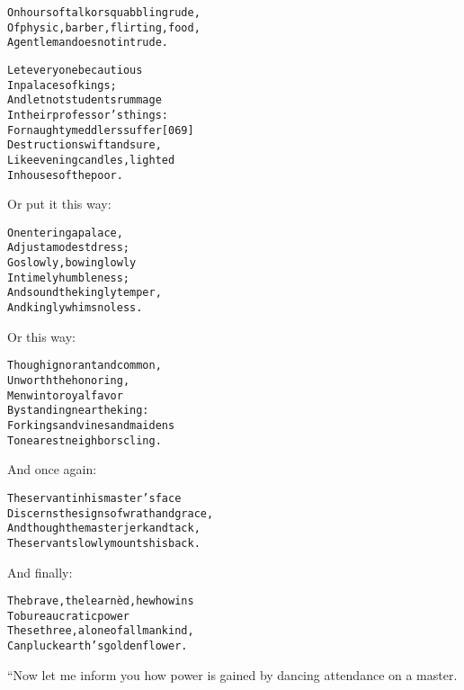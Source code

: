 \documentclass{article}
\renewenvironment{verbatim}{\begin{alltt}\normalfont\begin{centering}}{\end{centering}\end{alltt}}
\begin{document}
\begin{verbatim}
On hours of talk or squabbling rude,
Of physic, barber, flirting, food,
A gentleman does not intrude.

Let everyone be cautious
    In palaces of kings;
And let not students rummage
    In their professor's things:
For naughty meddlers suffer                             [069]
    Destruction swift and sure,
Like evening candles, lighted
    In houses of the poor.
\end{verbatim}
Or put it this way:

\begin{verbatim}
On entering a palace,
    Adjust a modest dress;
Go slowly, bowing lowly
    In timely humbleness;
And sound the kingly temper,
    And kingly whims no less.
\end{verbatim}
Or this way:

\begin{verbatim}
Though ignorant and common,
    Unworth the honoring,
Men win to royal favor
    By standing near the king:
For kings and vines and maidens
    To nearest neighbors cling.
\end{verbatim}
And once again:

\begin{verbatim}
The servant in his master's face
Discerns the signs of wrath and grace,
And though the master jerk and tack,
The servant slowly mounts his back.
\end{verbatim}
And finally:

\begin{verbatim}
The brave, the learnèd, he who wins
    To bureaucratic power
These three, alone of all mankind,
    Can pluck earth's golden flower.
\end{verbatim}
“Now let me inform you how power is gained by dancing attendance on
a master.
\end{document}
